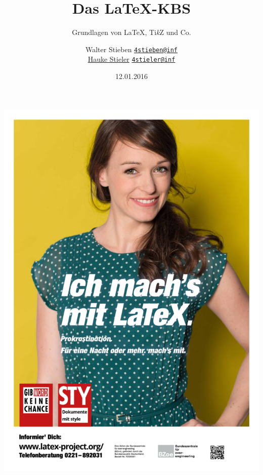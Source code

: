 \documentclass{beamer}
\title{Das \LaTeX-KBS}
\subtitle{\small Grundlagen von \LaTeX, Ti\textit{k}Z und Co.}
\author
{
	Walter Stieben \texttt{\href{mailto:4stieben@informatik.uni-hamburg.de}{4stieben@inf}}\\
	\href{http://hauke-stieler.de/}{Hauke Stieler} \texttt{\href{mailto:4stieler@informatik.uni-hamburg.de}{4stieler@inf}}
}
\date{\footnotesize 12.01.2016}
\begin{document}
	\maketitle
	\begin{frame}
		\begin{minipage}[t][0.5\textheight]{0.5\textwidth}
			\vspace{0pt} 
			\tableofcontents
		\end{minipage}
		\begin{minipage}[t]{0.45\textwidth} 
			\vspace{0pt}  
			\includegraphics[width=\textwidth]{./images/gib-word-keine-chance}
		\end{minipage}
	\end{frame}
		
		
\end{document}
